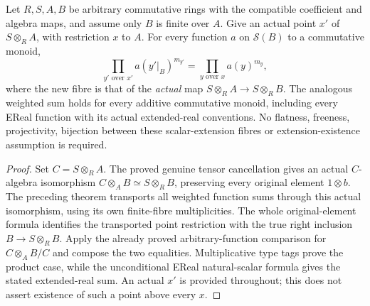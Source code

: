 \begin{theorem}
\label{spectrum:all-function-scalar-extension}
\leanok
{}
Let $R,S,A,B$ be arbitrary commutative rings with the compatible coefficient
and algebra maps, and assume only $B$ is finite over $A$. Give an actual
point $x'$ of $S\otimes_RA$, with restriction $x$ to $A$. For every function
$a$ on $\mathcal S(B)$ to a commutative monoid,
\[
 \prod_{y'\text{ over }x'}a(y'|_B)^{m_{y'}}
 =\prod_{y\text{ over }x}a(y)^{m_y},
\]
where the new fibre is that of the \emph{actual} map
$S\otimes_RA\to S\otimes_RB$. The analogous weighted sum holds for every
additive commutative monoid, including every EReal function with its actual
extended-real conventions. No flatness, freeness, projectivity, bijection
between these scalar-extension fibres or extension-existence assumption is
required.
\end{theorem}
\begin{proof}
Set $C=S\otimes_RA$. The proved genuine tensor cancellation gives an
actual $C$-algebra isomorphism
$C\otimes_AB\simeq S\otimes_RB$, preserving every original element
$1\otimes b$. The preceding theorem transports all weighted function sums
through this actual isomorphism, using its own finite-fibre multiplicities.
The whole original-element formula identifies the transported point
restriction with the true right inclusion $B\to S\otimes_RB$.
Apply the already proved arbitrary-function comparison for
$C\otimes_AB/C$ and compose the two equalities. Multiplicative type tags
prove the product case, while the unconditional EReal natural-scalar formula
gives the stated extended-real sum. An actual $x'$ is provided throughout;
this does not assert existence of such a point above every $x$.
\end{proof}
